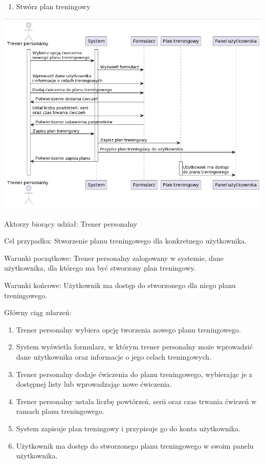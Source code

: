 \documentclass[
]{article}
\providecommand{\tightlist}{%
  \setlength{\itemsep}{0pt}\setlength{\parskip}{0pt}}
\begin{document}
\begin{enumerate}
\tightlist
\item
  {Stwórz plan treningowy}
\end{enumerate}

{\includegraphics{diagrams/sequence/tworzenie_planu_treningu.png}}

{}

{Aktorzy biorący udział: Trener personalny}

{Cel przypadku: Stworzenie planu treningowego dla konkretnego
użytkownika.}

{Warunki początkowe: Trener personalny zalogowany w systemie, dane
użytkownika, dla którego ma być stworzony plan treningowy.}

{Warunki końcowe: Użytkownik ma dostęp do stworzonego dla niego planu
treningowego.}

{Główny ciąg zdarzeń:}

\begin{enumerate}
\tightlist
\item
  {Trener personalny wybiera opcję tworzenia nowego planu treningowego.}
\item
  {System wyświetla formularz, w którym trener personalny może
  wprowadzić dane użytkownika oraz informacje o jego celach
  treningowych.}
\item
  {Trener personalny dodaje ćwiczenia do planu treningowego, wybierając
  je z dostępnej listy lub wprowadzając nowe ćwiczenia.}
\item
  {Trener personalny ustala liczbę powtórzeń, serii oraz czas trwania
  ćwiczeń w ramach planu treningowego.}
\item
  {System zapisuje plan treningowy i przypisuje go do konta
  użytkownika.}
\item
  {Użytkownik ma dostęp do stworzonego planu treningowego w swoim panelu
  użytkownika.}
\end{enumerate}
\end{document}

